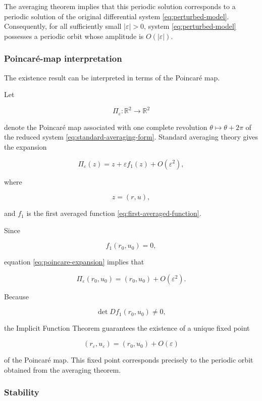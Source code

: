 \documentclass[11pt,reqno]{amsart}
\theoremstyle{plain}
\theoremstyle{definition}
\theoremstyle{remark}
\begin{document}
The averaging theorem implies that this periodic solution corresponds
to a periodic solution of the original differential system
\eqref{eq:perturbed-model}. Consequently, for all sufficiently small
$|\varepsilon|>0$, system \eqref{eq:perturbed-model} possesses a
periodic orbit whose amplitude is $O(|\varepsilon|)$.


\subsubsection*{Poincaré-map interpretation}

The existence result can be interpreted in terms of the Poincaré map.

Let

\[
\Pi_\varepsilon:\mathbb{R}^2\rightarrow\mathbb{R}^2
\]

denote the Poincaré map associated with one complete revolution
$\theta\mapsto\theta+2\pi$ of the reduced system
\eqref{eq:standard-averaging-form}. Standard averaging theory gives the
expansion

\begin{equation}
\label{eq:poincare-expansion}
\boxed{
\Pi_\varepsilon(z)
=
z
+
\varepsilon f_1(z)
+
O(\varepsilon^2),
}
\end{equation}

where

\[
z=(r,u),
\]

and $f_1$ is the first averaged function
\eqref{eq:first-averaged-function}.

Since

\[
f_1(r_0,u_0)=0,
\]

equation \eqref{eq:poincare-expansion} implies that

\[
\Pi_\varepsilon(r_0,u_0)
=
(r_0,u_0)
+
O(\varepsilon^2).
\]

Because

\[
\det Df_1(r_0,u_0)\neq0,
\]

the Implicit Function Theorem guarantees the existence of a unique
fixed point

\[
(r_\varepsilon,u_\varepsilon)
=
(r_0,u_0)+O(\varepsilon)
\]

of the Poincaré map. This fixed point corresponds precisely to the
periodic orbit obtained from the averaging theorem.


\subsubsection*{Stability}
\end{document}

